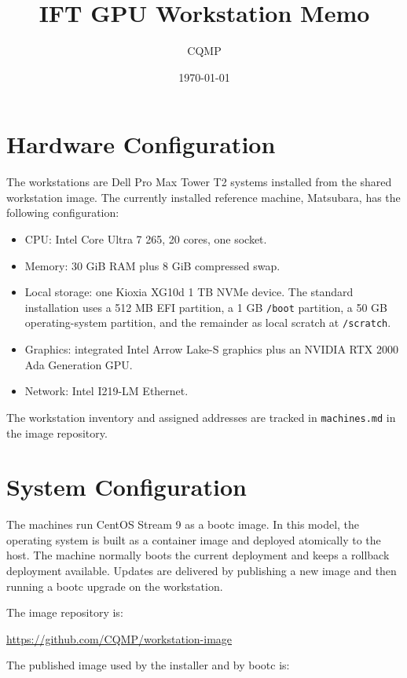 \documentclass[11pt]{article}
\title{IFT GPU Workstation Memo}
\author{CQMP}
\date{\today}
\begin{document}
\maketitle

\section{Hardware Configuration}

The workstations are Dell Pro Max Tower T2 systems installed from the shared
workstation image.  The currently installed reference machine, Matsubara, has
the following configuration:

\begin{itemize}
  \item CPU: Intel Core Ultra 7 265, 20 cores, one socket.
  \item Memory: 30 GiB RAM plus 8 GiB compressed swap.
  \item Local storage: one Kioxia XG10d 1 TB NVMe device.  The standard
        installation uses a 512 MB EFI partition, a 1 GB \texttt{/boot}
        partition, a 50 GB operating-system partition, and the remainder as
        local scratch at \texttt{/scratch}.
  \item Graphics: integrated Intel Arrow Lake-S graphics plus an NVIDIA
        RTX 2000 Ada Generation GPU.
  \item Network: Intel I219-LM Ethernet.
\end{itemize}

The workstation inventory and assigned addresses are tracked in
\texttt{machines.md} in the image repository.

\section{System Configuration}

The machines run CentOS Stream 9 as a bootc image.  In this model, the
operating system is built as a container image and deployed atomically to the
host.  The machine normally boots the current deployment and keeps a rollback
deployment available.  Updates are delivered by publishing a new image and then
running a bootc upgrade on the workstation.

The image repository is:

\begin{center}
\url{https://github.com/CQMP/workstation-image}
\end{center}

The published image used by the installer and by bootc is:
\end{document}
